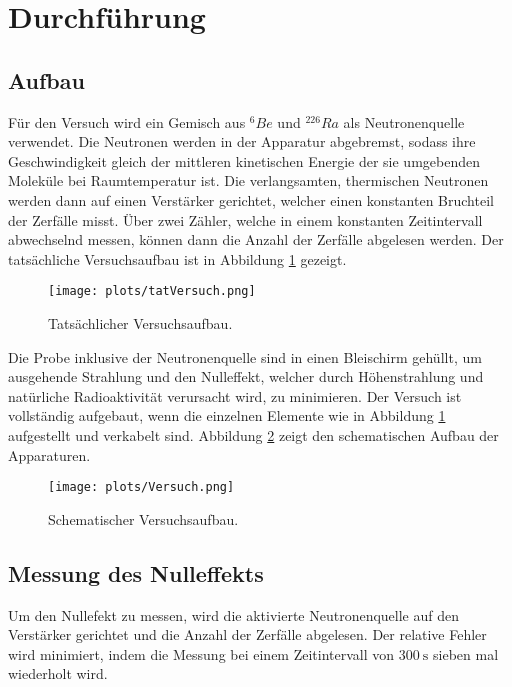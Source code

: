 \section{Durchführung}
\label{sec:Durchführung}

\subsection{Aufbau}
Für den Versuch wird ein Gemisch aus $^6Be$ und $^{226}Ra$ als Neutronenquelle verwendet. Die Neutronen werden in der Apparatur abgebremst,
sodass ihre Geschwindigkeit gleich der mittleren kinetischen Energie der sie umgebenden Moleküle bei Raumtemperatur ist.
Die verlangsamten, thermischen Neutronen werden dann auf einen Verstärker gerichtet, welcher einen konstanten Bruchteil der Zerfälle misst.
Über zwei Zähler, welche in einem konstanten Zeitintervall abwechselnd messen, können dann die Anzahl der Zerfälle abgelesen werden.
Der tatsächliche Versuchsaufbau ist in Abbildung \ref{fig:tatVersuch} gezeigt.

\begin{figure}
    \centering
    \texttt{[image: plots/tatVersuch.png]}
    \caption{Tatsächlicher Versuchsaufbau.\cite{Versuchsanleitung}}
    \label{fig:tatVersuch}
\end{figure}

Die Probe inklusive der Neutronenquelle sind in einen Bleischirm gehüllt, um ausgehende Strahlung und den Nulleffekt, welcher durch Höhenstrahlung und natürliche Radioaktivität verursacht wird,
zu minimieren.
Der Versuch ist vollständig aufgebaut, wenn die einzelnen Elemente wie in Abbildung \ref{fig:tatVersuch} aufgestellt und verkabelt sind.
Abbildung \ref{fig:schVersuch} zeigt den schematischen Aufbau der Apparaturen.

\begin{figure}
    \centering
    \texttt{[image: plots/Versuch.png]}
    \caption{Schematischer Versuchsaufbau.\cite{Versuchsanleitung}}
    \label{fig:schVersuch}
\end{figure}

\subsection{Messung des Nulleffekts}
Um den Nullefekt zu messen, wird die aktivierte Neutronenquelle auf den Verstärker gerichtet und die Anzahl der Zerfälle abgelesen.
Der relative Fehler wird minimiert, indem die Messung bei einem Zeitintervall von $\SI{300}{\second}$ sieben mal wiederholt wird.

